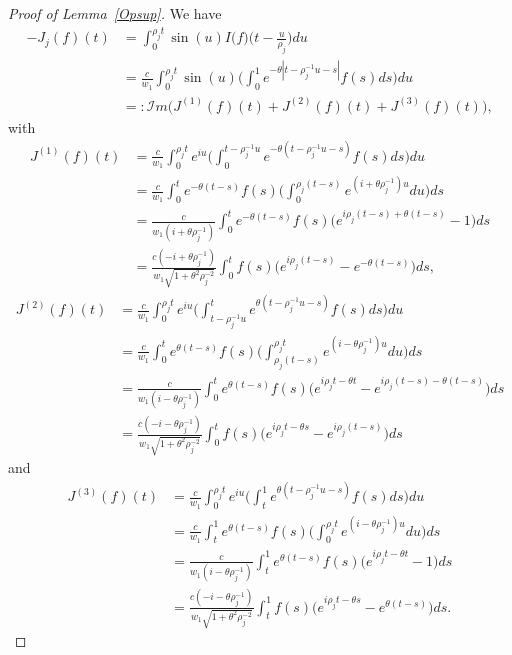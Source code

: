 \documentclass[10pt,a4paper]{amsart}
\begin{document}
\begin{proof}[Proof of Lemma~\ref{Opsup}]
 We have
\begin{align*}
-J_j(f)(t)&=\int_0^{\rho_j t}\sin(u)I\big(f\big)\Big(t-\frac{u}{\rho_j}\Big)du\\
&=\frac{c}{w_1}\int_0^{\rho_j t}\sin(u)\Big(\int_0^1e^{-\theta\left|t-\rho_j^{-1}u-s\right|}f(s)ds\Big)du\\
&=:{\mathcal I}m\Bigg(J^{(1)}(f)(t)+J^{(2)}(f)(t)+J^{(3)}(f)(t)\Bigg),
\end{align*}
with
\begin{align*}
J^{(1)}(f)(t)&=\frac{c}{w_1}\int_0^{\rho_j t}e^{iu}\Big(\int_0^{t-\rho_j^{-1}u}e^{-\theta\left(t-\rho_j^{-1}u-s\right)}f(s)ds\Big)du\\
&=\frac{c}{w_1}\int_0^te^{-\theta(t-s)}f(s)\Big(\int_0^{\rho_j (t-s)}e^{(i+\theta\rho_j^{-1})u}du\Big)ds\\
&=\frac{c}{w_1(i+\theta\rho_j^{-1})}\int_0^te^{-\theta(t-s)}f(s)\Big(e^{i\rho_j (t-s)+\theta(t-s)}-1\Big)ds\\
&=\frac{c(-i+\theta\rho_j^{-1})}{w_1\sqrt{1+\theta^2\rho_j^{-2}}}\int_0^tf(s)\Big(e^{i\rho_j (t-s)}-e^{-\theta(t-s)}\Big)ds,
\end{align*}
\begin{align*}
J^{(2)}(f)(t)&=\frac{c}{w_1}\int_0^{\rho_j t}e^{iu}\Big(\int_{t-\rho_j^{-1}u}^te^{\theta\left(t-\rho_j^{-1}u-s\right)}f(s)ds\Big)du\\
&=\frac{c}{w_1}\int_0^te^{\theta(t-s)}f(s)\Big(\int_{\rho_j (t-s)}^{\rho_j t}e^{(i-\theta\rho_j^{-1})u}du\Big)ds\\
&=\frac{c}{w_1(i-\theta\rho_j^{-1})}\int_0^te^{\theta(t-s)}f(s)\Big(e^{i\rho_jt-\theta t}-e^{i\rho_j(t-s)-\theta (t-s)}\Big)ds\\
&=\frac{c(-i-\theta\rho_j^{-1})}{w_1\sqrt{1+\theta^2\rho_j^{-2}}}\int_0^tf(s)\Big(e^{i\rho_jt-\theta s}-e^{i\rho_j(t-s)}\Big)ds
\end{align*}
and
\begin{align*}
J^{(3)}(f)(t)&=\frac{c}{w_1}\int_0^{\rho_j t}e^{iu}\Big(\int_t^1e^{\theta\left(t-\rho_j^{-1}u-s\right)}f(s)ds\Big)du\\
&=\frac{c}{w_1}\int_t^1e^{\theta(t-s)}f(s)\Big(\int_{0}^{\rho_j t}e^{(i-\theta\rho_j^{-1})u}du\Big)ds\\
&=\frac{c}{w_1(i-\theta\rho_j^{-1})}\int_t^1e^{\theta(t-s)}f(s)\Big(e^{i\rho_jt-\theta t}-1\Big)ds\\
&=\frac{c(-i-\theta\rho_j^{-1})}{w_1\sqrt{1+\theta^2\rho_j^{-2}}}\int_t^1f(s)\Big(e^{i\rho_jt-\theta s}-e^{\theta(t-s)}\Big)ds.

\end{align*}
\end{proof}
\end{document}
